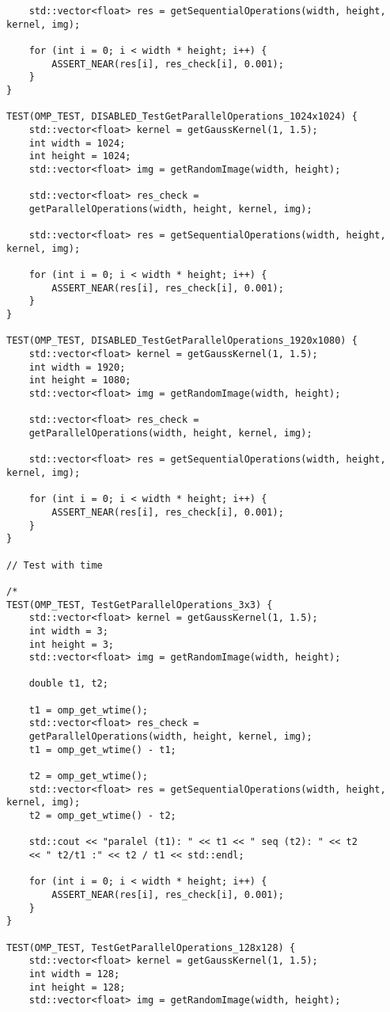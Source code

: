 \documentclass{report}
\begin{document}
\begin{lstlisting}
	std::vector<float> res = getSequentialOperations(width, height, kernel, img);
	
	for (int i = 0; i < width * height; i++) {
		ASSERT_NEAR(res[i], res_check[i], 0.001);
	}
}

TEST(OMP_TEST, DISABLED_TestGetParallelOperations_1024x1024) {
	std::vector<float> kernel = getGaussKernel(1, 1.5);
	int width = 1024;
	int height = 1024;
	std::vector<float> img = getRandomImage(width, height);
	
	std::vector<float> res_check =
	getParallelOperations(width, height, kernel, img);
	
	std::vector<float> res = getSequentialOperations(width, height, kernel, img);
	
	for (int i = 0; i < width * height; i++) {
		ASSERT_NEAR(res[i], res_check[i], 0.001);
	}
}

TEST(OMP_TEST, DISABLED_TestGetParallelOperations_1920x1080) {
	std::vector<float> kernel = getGaussKernel(1, 1.5);
	int width = 1920;
	int height = 1080;
	std::vector<float> img = getRandomImage(width, height);
	
	std::vector<float> res_check =
	getParallelOperations(width, height, kernel, img);
	
	std::vector<float> res = getSequentialOperations(width, height, kernel, img);
	
	for (int i = 0; i < width * height; i++) {
		ASSERT_NEAR(res[i], res_check[i], 0.001);
	}
}

// Test with time

/*
TEST(OMP_TEST, TestGetParallelOperations_3x3) {
	std::vector<float> kernel = getGaussKernel(1, 1.5);
	int width = 3;
	int height = 3;
	std::vector<float> img = getRandomImage(width, height);
	
	double t1, t2;
	
	t1 = omp_get_wtime();
	std::vector<float> res_check =
	getParallelOperations(width, height, kernel, img);
	t1 = omp_get_wtime() - t1;
	
	t2 = omp_get_wtime();
	std::vector<float> res = getSequentialOperations(width, height, kernel, img);
	t2 = omp_get_wtime() - t2;
	
	std::cout << "paralel (t1): " << t1 << " seq (t2): " << t2
	<< " t2/t1 :" << t2 / t1 << std::endl;
	
	for (int i = 0; i < width * height; i++) {
		ASSERT_NEAR(res[i], res_check[i], 0.001);
	}
}

TEST(OMP_TEST, TestGetParallelOperations_128x128) {
	std::vector<float> kernel = getGaussKernel(1, 1.5);
	int width = 128;
	int height = 128;
	std::vector<float> img = getRandomImage(width, height);
	

\end{lstlisting}
\end{document}
